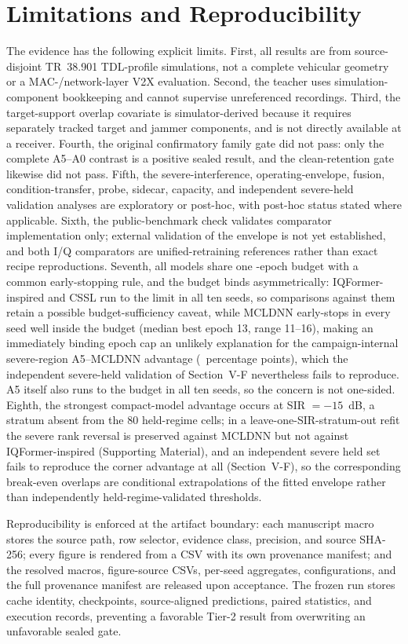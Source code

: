 \documentclass[letterpaper,journal]{IEEEtran}
\newcommand{\pp}{percentage points}
\begin{document}
\section{Limitations and Reproducibility}
The evidence has the following explicit limits. First, all results are from
source-disjoint TR~38.901 TDL-profile simulations, not a complete vehicular
geometry or a MAC-/network-layer V2X evaluation. Second, the teacher uses
simulation-component bookkeeping and cannot supervise unreferenced recordings.
Third, the target-support overlap covariate is simulator-derived because it
requires separately tracked target and jammer components, and is not directly
available at a receiver. Fourth, the original confirmatory family gate did not
pass: only the complete A5--A0 contrast is a positive sealed result, and the
clean-retention gate likewise did not pass. Fifth, the severe-interference,
operating-envelope, fusion, condition-transfer, probe, sidecar, capacity,
and independent severe-held validation
analyses are exploratory or post-hoc, with post-hoc status stated where
applicable. Sixth, the public-benchmark check validates comparator
implementation only; external validation of the envelope is not yet
established, and both I/Q comparators are unified-retraining references rather
than exact recipe reproductions. Seventh, all models share one
\TrainEpochs-epoch budget with a common early-stopping rule, and the budget
binds asymmetrically: IQFormer-inspired and CSSL run to the limit in all ten
seeds, so comparisons against them retain a possible budget-sufficiency
caveat, while MCLDNN early-stops in every seed well inside the budget (median
best epoch 13, range 11--16), making an immediately binding epoch cap an
unlikely explanation for the campaign-internal severe-region A5--MCLDNN
advantage (\SevereGainMcldnn\ \pp), which the independent severe-held
validation of Section~V-F nevertheless fails to reproduce. A5 itself also runs to the budget in all ten
seeds, so the concern is not one-sided. Eighth, the strongest compact-model
advantage occurs at SIR $=-15$~dB, a stratum absent from the 80 held-regime
cells; in a leave-one-SIR-stratum-out refit the severe rank reversal is
preserved against MCLDNN but not against IQFormer-inspired (Supporting
Material), and an independent severe held set fails to reproduce the corner
advantage at all (Section~V-F), so the corresponding break-even
overlaps are conditional extrapolations of the fitted envelope rather than
independently held-regime-validated thresholds.

Reproducibility is enforced at the artifact boundary: each manuscript macro
stores the source path, row selector, evidence class, precision, and source
SHA-256; every figure is rendered from a CSV with its own provenance
manifest; and the resolved macros, figure-source CSVs, per-seed aggregates,
configurations, and the full provenance manifest are released upon
acceptance. The frozen run stores cache identity, checkpoints,
source-aligned predictions, paired statistics, and execution records,
preventing a favorable Tier-2 result from overwriting an unfavorable sealed
gate.
\end{document}
